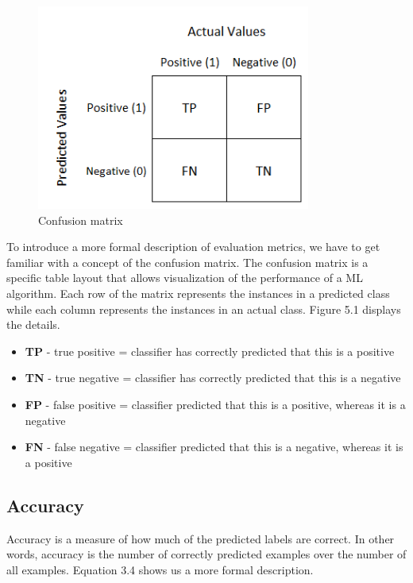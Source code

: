 \documentclass[times, utf8, seminar]{fer}
\begin{document}
\begin{figure}[h]
	\centering
	\includegraphics[width=9cm]{confusion-matrix}
	\caption{Confusion matrix \protect \footnotemark}
\end{figure}


To introduce a more formal description of evaluation metrics, we have to get familiar with a concept of the confusion matrix. The confusion matrix is a specific table layout that allows visualization of the performance of a ML algorithm. Each row of the matrix represents the instances in a predicted class while each column represents the instances in an actual class. Figure 5.1 displays the details.

\newpage

\begin{itemize}
\item \textbf{TP} - true positive = classifier has correctly predicted that this is a positive
\item \textbf{TN} - true negative = classifier has correctly predicted that this is a negative
\item \textbf{FP} - false positive = classifier predicted that this is a positive, whereas it is a negative
\item \textbf{FN} - false negative = classifier predicted that this is a negative, whereas it is a positive 
\end{itemize}


\subsection{Accuracy}

Accuracy is a measure of how much of the predicted labels are correct. In other words, accuracy is the number of correctly predicted examples over the number of all examples. Equation 3.4 shows us a more formal description.
\end{document}
